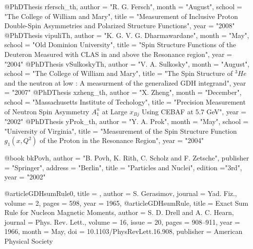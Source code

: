 @PhDThesis{ rfersch_th,
	author = "R. G. Fersch",
	month = "August",
	school = "The College of William and Mary",
	title = "{Measurement of Inclusive Proton Double-Spin Asymmetries and Polarized Structure Functions}",
	year = "2008"
}
@PhDThesis{ vipuliTh,
	author = "K. G. V. G. Dharmawardane",
	month = "May",
	school = "Old Dominion University",
	title = "{Spin Structure Functions of the Deuteron Measured with CLAS in and above the Resonance region}",
	year = "2004"
}
@PhDThesis{ vSulkoskyTh,
	author = "V. A. Sulkosky",
	month = "August",
	school = "The College of William and Mary",
	title = "{The Spin Structure of $^3He$ and the neutron at low \qsq: A measurment of the generalized GDH integrand}",
	year = "2007"
}
@PhDThesis{ xzheng_th,
	author = "X. Zheng",
	month = "December",
	school = "Massachusetts Institute of Techology",
	title = "{Precision Measurement of Neutron Spin Asymmetry $A_1^n$ at Large $x_{Bj}$ Using CEBAF at 5.7 GeV}",
	year = "2002"
}
@PhDThesis{ yProk_th,
	author = "Y. A. Prok",
	month = "May",
	school = "University of Virginia",
	title = "{Measurement of the Spin Structure Function $g_1(x,Q^2)$ of the Proton in the Resonance Region}",
	year = "2004"
}



@book{ bkPovh,
	author = "B. Povh, K. Rith, C. Scholz and F. Zetsche",
	publisher = "Springer",
	address = "Berlin",
	title = "Particles and Nuclei",
	edition ="3rd",
	year = "2002"
}

@article{GDHsumRule0,
  title = {},
  author = {S. Gerasimov},
  journal = {Yad. Fiz.},
  volume = {2},
  pages = {598},
  year = {1965},
}
@article{GDHsumRule,
  title = {Exact Sum Rule for Nucleon Magnetic Moments},
  author = {S. D. Drell and A. C. Hearn},
  journal = {Phys. Rev. Lett.},
  volume = {16},
  issue = {20},
  pages = {908--911},
  year = {1966},
  month = {May},
  doi = {10.1103/PhysRevLett.16.908},
  publisher = {American Physical Society}
}

